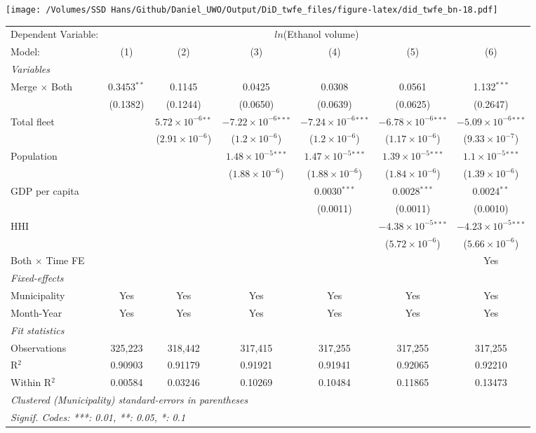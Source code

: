 \documentclass[
]{article}
\begin{document}
\texttt{[image: /Volumes/SSD Hans/Github/Daniel\_UWO/Output/DiD\_twfe\_files/figure-latex/did\_twfe\_bn-18.pdf]}

\begin{tabular}{lcccccc}
\tabularnewline\midrule\midrule
Dependent Variable:&\multicolumn{6}{c}{$ln$(Ethanol volume)}\\
Model:&(1) & (2) & (3) & (4) & (5) & (6)\\
\midrule \emph{Variables}&   &   &   &   &   &  \\
Merge $\times $ Both & 0.3453$^{**}$ & 0.1145 & 0.0425 & 0.0308 & 0.0561 & 1.132$^{***}$\\
  &(0.1382) & (0.1244) & (0.0650) & (0.0639) & (0.0625) & (0.2647)\\
Total fleet &    & $5.72\times 10^{-6}$$^{**}$ & $-7.22\times 10^{-6}$$^{***}$ & $-7.24\times 10^{-6}$$^{***}$ & $-6.78\times 10^{-6}$$^{***}$ & $-5.09\times 10^{-6}$$^{***}$\\
  &   & ($2.91\times 10^{-6}$) & ($1.2\times 10^{-6}$) & ($1.2\times 10^{-6}$) & ($1.17\times 10^{-6}$) & ($9.33\times 10^{-7}$)\\
Population &    &    & $1.48\times 10^{-5}$$^{***}$ & $1.47\times 10^{-5}$$^{***}$ & $1.39\times 10^{-5}$$^{***}$ & $1.1\times 10^{-5}$$^{***}$\\
  &   &    & ($1.88\times 10^{-6}$) & ($1.88\times 10^{-6}$) & ($1.84\times 10^{-6}$) & ($1.39\times 10^{-6}$)\\
GDP per capita &    &    &    & 0.0030$^{***}$ & 0.0028$^{***}$ & 0.0024$^{**}$\\
  &   &    &    & (0.0011) & (0.0011) & (0.0010)\\
HHI &    &    &    &    & $-4.38\times 10^{-5}$$^{***}$ & $-4.23\times 10^{-5}$$^{***}$\\
  &   &    &    &    & ($5.72\times 10^{-6}$) & ($5.66\times 10^{-6}$)\\
Both $\times$ Time FE &  &  &  &  &  & Yes\\
\midrule \emph{Fixed-effects}&   &   &   &   &   &  \\
Municipality & Yes & Yes & Yes & Yes & Yes & Yes\\
Month-Year & Yes & Yes & Yes & Yes & Yes & Yes\\
\midrule \emph{Fit statistics}&  & & & & & \\
Observations & 325,223&318,442&317,415&317,255&317,255&317,255\\
R$^2$ & 0.90903&0.91179&0.91921&0.91941&0.92065&0.92210\\
Within R$^2$ & 0.00584&0.03246&0.10269&0.10484&0.11865&0.13473\\
\midrule\midrule\multicolumn{7}{l}{\emph{Clustered (Municipality) standard-errors in parentheses}}\\
\multicolumn{7}{l}{\emph{Signif. Codes: ***: 0.01, **: 0.05, *: 0.1}}\\
\end{tabular}
\end{document}
